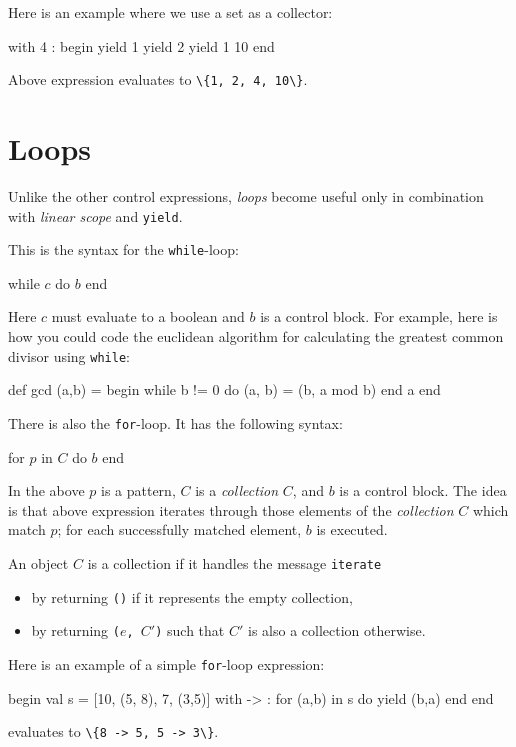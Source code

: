 \documentclass[11pt]{amsart}
\newcommand{\babelsrc}[1] {\lstinline!#1!}
\begin{document}
Here is an example where we use a set as a collector:
\begin{babellisting}
with {4} : begin
  yield 1
  yield 2
  yield 1
  10
end
\end{babellisting}
Above expression evaluates to \babelsrc{\{1, 2, 4, 10\}}.

\section{Loops}
Unlike the other control expressions, \emph{loops} become useful only in combination with \emph{linear scope} and \babelsrc{yield}. 

This is the syntax for the \babelsrc{while}-loop:
\begin{babellisting}
while $c$ do
  $b$
end
\end{babellisting}
Here $c$ must evaluate to a boolean and $b$ is a control block. For example, here is how you could code the euclidean algorithm for calculating the greatest common divisor using \babelsrc{while}:
\begin{babellisting}
def gcd (a,b) = begin
  while b != 0 do
    (a, b) = (b, a mod b)
  end
  a
end
\end{babellisting}

There is also the \babelsrc{for}-loop. It has the following syntax:
\begin{babellisting}
for $p$ in $C$ do
  $b$
end
\end{babellisting}
In the above $p$ is a pattern, $C$ is a \emph{collection} $C$, and $b$ is a control block.
The idea is that above expression iterates through those elements of the \emph{collection} $C$ 
which match $p$; for each successfully matched element, $b$ is executed. 

An object $C$ is a collection if it handles the message \texttt{iterate}
\begin{itemize}
\item by returning \texttt{()} if it represents the empty collection,
\item by returning \texttt{($e$, $C'$)} such that $C'$ is also a collection otherwise.
\end{itemize}

Here is an example of a simple \babelsrc{for}-loop expression:
\begin{babellisting}
begin
  val s = [10, (5, 8), 7, (3,5)]
  with {->} : for (a,b) in s do
    yield (b,a)
  end
end
\end{babellisting}
evaluates to \babelsrc{\{8 -> 5, 5 -> 3\}}.
\end{document}
